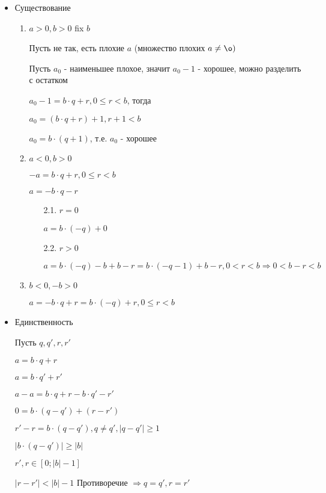 \documentclass[14pt, letter paper]{article}
\begin{document}
\begin{itemize}
    \item Существование

    \begin{enumerate}
        \item $a > 0, b > 0$ fix $b$

        Пусть не так, есть плохие $a$ (множество плохих $a \neq \o)$

        Пусть $a_0$ - наименьшее плохое, значит $a_0 - 1$ - хорошее, можно разделить с остатком

        $a_0 - 1 = b \cdot q + r, 0 \leq r < b$, тогда 
        
        $a_0 = (b \cdot q + r) + 1, r + 1 < b$

        $a_0 = b \cdot (q + 1)$, т.е. $a_0$ - хорошее

        \item $a < 0, b > 0$

        $-a = b \cdot q + r, 0 \leq r < b$

        $a = -b \cdot q - r$

        \begin{enumerate}
            \item[2.1.] $r = 0$

            $a = b \cdot (-q) + 0$

            \item[2.2.] $r > 0$

            $a = b \cdot (-q) - b + b - r = b \cdot (-q - 1) + b - r, 0 < r < b \Rightarrow 0 < b - r < b$
        \end{enumerate}

        \item $b < 0, -b > 0$

        $a = -b \cdot q + r = b \cdot (-q) + r, 0 \leq r < b$
    \end{enumerate}

    \item Единственность

    Пусть $q, q', r, r'$

    $a = b \cdot q + r$

    $a = b \cdot q' + r'$

    $a - a = b \cdot q + r - b \cdot q' - r'$

    $0 = b \cdot (q - q') + (r - r')$

    $r' - r = b \cdot (q - q'), q \neq q', |q - q'| \geq 1$

    $|b \cdot (q - q')| \geq |b|$

    $r', r \in [0 ; |b| - 1]$

    $|r - r'| < |b| - 1$ Противоречие $\Rightarrow q = q', r = r'$
\end{itemize}
\end{document}
